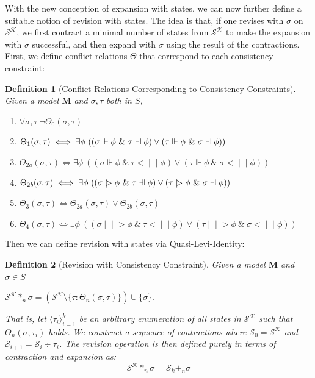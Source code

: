 \documentclass[12pt]{article}
\newtheorem{definition}{Definition}[section]
\newcommand{\fal}{\mathrel{\text{\reflectbox{$\Vdash$}}}}
\newcommand{\ver}{\Vdash}
\newcommand{\inever}{\mid \! \mid \!\!>}
\newcommand{\inefal}{< \! \! \mid \! \mid}
\newcommand{\SK}{\mathcal{S}^\mathcal{K}}
\begin{document}
With the new conception of expansion with states, we can now further define a suitable notion of revision with states. The idea is that, if one revises with $\sigma$ on $\SK$, we first contract a minimal number of states from $\SK$ to make the expansion with $\sigma$ successful, and then expand with $\sigma$ using the result of the contractions. First, we define conflict relations $\Theta$ that correspond to each consistency constraint: 
\begin{definition}[Conflict Relations Corresponding to Consistency Constraints]
    Given a model $\bm{M}$ and $\sigma, \tau$ both in $S$, 
    \begin{enumerate} 
        \item[\emph{(0)}] $\forall \sigma, \tau \ \lnot \Theta_0(\sigma, \tau)$
        \item[\emph{(1)}] $\Theta_1(\sigma, \tau) \iff \exists \phi \ ((\sigma \ver \phi \ \& \  \tau \fal \phi) \lor (\tau \ver \phi \ \& \  \sigma \fal \phi))$
        \item[\emph{(2a)}] $\Theta_{2a}(\sigma, \tau) \iff \exists \phi \ ((\sigma \ver \phi \ \& \  \tau \inefal \phi) \lor (\tau \ver \phi \ \& \  \sigma \inefal \phi))$
        \item[\emph{(2b)}] $\Theta_{2b}(\sigma, \tau) \iff \exists \phi \ ((\sigma \inever \phi \ \& \  \tau \fal \phi) \lor (\tau \inever \phi \ \& \  \sigma \fal \phi))$
        \item[\emph{(3)}] $\Theta_3(\sigma, \tau) \iff \Theta_{2a}(\sigma, \tau) \lor \Theta_{2b}(\sigma, \tau)$
        \item[\emph{(4)}] $\Theta_4(\sigma, \tau) \iff \exists \phi \ ((\sigma \inever \phi \ \& \  \tau \inefal \phi) \lor (\tau \inever \phi \ \& \  \sigma \inefal \phi))$
    \end{enumerate}
\end{definition}
Then we can define revision with states via Quasi-Levi-Identity:
\begin{definition}[Revision with Consistency Constraint]
    Given a model $\bm{M}$ and $\sigma \in S$ \par
    $\SK *_n \sigma = (\SK \setminus \{\tau: \Theta_n (\sigma, \tau)\}) \cup \{\sigma\}.$ 
    \par 
    That is, let $\langle \tau_i \rangle_{i=1}^k$ be an arbitrary enumeration of all states in $\mathcal{S}^\mathcal{K}$ such that $\Theta_n(\sigma, \tau_i)$ holds. We construct a sequence of contractions where $\mathcal{S}_0 = \mathcal{S}^\mathcal{K}$ and $\mathcal{S}_{i+1} = \mathcal{S}_{i} \div \tau_i$. The revision operation is then defined purely in terms of contraction and expansion as:
\begin{equation*}
    \mathcal{S}^\mathcal{K} *_n \sigma = \mathcal{S}_k +_n \sigma
\end{equation*}
\end{definition}
\end{document}
